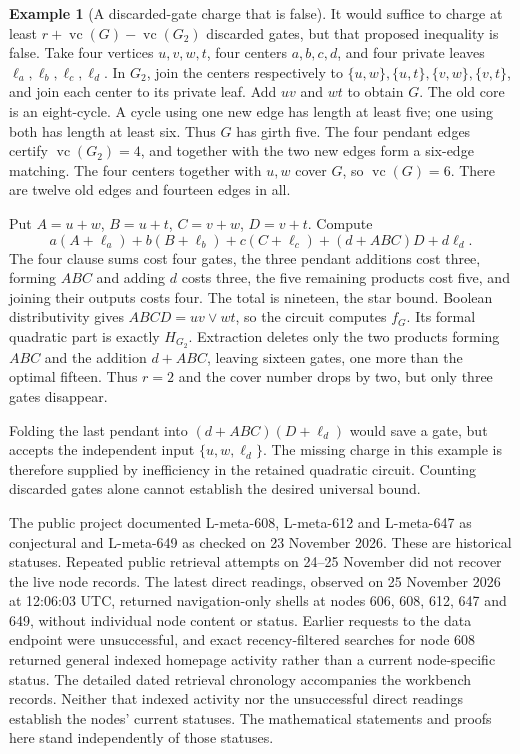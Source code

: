 \documentclass[11pt]{article}
\newcommand{\vc}{\operatorname{vc}}
\theoremstyle{definition}
\newtheorem{example}[theorem]{Example}
\theoremstyle{remark}
\begin{document}
\begin{example}[A discarded-gate charge that is false]\label{ex:chargefailure}
It would suffice to charge at least $r+\vc(G)-\vc(G_2)$ discarded gates, but that proposed inequality is false. Take four vertices $u,v,w,t$, four centers $a,b,c,d$, and four private leaves $\ell_a,\ell_b,\ell_c,\ell_d$. In $G_2$, join the centers respectively to $\{u,w\},\{u,t\},\{v,w\},\{v,t\}$, and join each center to its private leaf. Add $uv$ and $wt$ to obtain $G$. The old core is an eight-cycle. A cycle using one new edge has length at least five; one using both has length at least six. Thus $G$ has girth five. The four pendant edges certify $\vc(G_2)=4$, and together with the two new edges form a six-edge matching. The four centers together with $u,w$ cover $G$, so $\vc(G)=6$. There are twelve old edges and fourteen edges in all.

Put $A=u+w$, $B=u+t$, $C=v+w$, $D=v+t$. Compute
\[
 a(A+\ell_a)+b(B+\ell_b)+c(C+\ell_c)
 +(d+ABC)D+d\ell_d.
\]
The four clause sums cost four gates, the three pendant additions cost three, forming $ABC$ and adding $d$ costs three, the five remaining products cost five, and joining their outputs costs four. The total is nineteen, the star bound. Boolean distributivity gives $ABCD=uv\vee wt$, so the circuit computes $f_G$. Its formal quadratic part is exactly $H_{G_2}$. Extraction deletes only the two products forming $ABC$ and the addition $d+ABC$, leaving sixteen gates, one more than the optimal fifteen. Thus $r=2$ and the cover number drops by two, but only three gates disappear.

Folding the last pendant into $(d+ABC)(D+\ell_d)$ would save a gate, but accepts the independent input $\{u,w,\ell_d\}$. The missing charge in this example is therefore supplied by inefficiency in the retained quadratic circuit. Counting discarded gates alone cannot establish the desired universal bound.
\end{example}

The public project documented L-meta-608, L-meta-612 and L-meta-647 as conjectural and L-meta-649 as checked on 23 November 2026. These are historical statuses. Repeated public retrieval attempts on 24--25 November did not recover the live node records. The latest direct readings, observed on 25 November 2026 at 12:06:03 UTC, returned navigation-only shells at nodes 606, 608, 612, 647 and 649, without individual node content or status. Earlier requests to the data endpoint were unsuccessful, and exact recency-filtered searches for node 608 returned general indexed homepage activity rather than a current node-specific status. The detailed dated retrieval chronology accompanies the workbench records. Neither that indexed activity nor the unsuccessful direct readings establish the nodes' current statuses. The mathematical statements and proofs here stand independently of those statuses.
\end{document}
